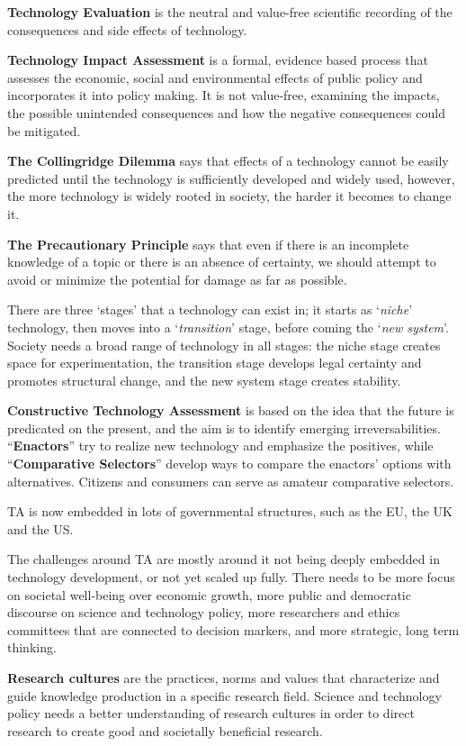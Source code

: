 \textbf{Technology Evaluation} is the neutral and value-free
scientific recording of the consequences and side effects of
technology.

\textbf{Technology Impact Assessment} is a formal, evidence based
process that assesses the economic, social and environmental effects
of public policy and incorporates it into policy making. It is not
value-free, examining the impacts, the possible unintended
consequences and how the negative consequences could be mitigated.

\textbf{The Collingridge Dilemma} says that effects of a technology
cannot be easily predicted until the technology is sufficiently
developed and widely used, however, the more technology is widely
rooted in society, the harder it becomes to change it.

\textbf{The Precautionary Principle} says that even if there is an
incomplete knowledge of a topic or there is an absence of certainty,
we should attempt to avoid or minimize the potential for damage as far
as possible.

There are three `stages' that a technology can exist in; it starts as
`\textit{niche}' technology, then moves into a `\textit{transition}'
stage, before coming the `\textit{new system}'. Society needs a broad
range of technology in all stages: the niche stage creates space for
experimentation, the transition stage develops legal certainty and
promotes structural change, and the new system stage creates
stability.

\textbf{Constructive Technology Assessment} is based on the idea that
the future is predicated on the present, and the aim is to identify
emerging irreversabilities. ``\textbf{Enactors}'' try to realize new
technology and emphasize the positives, while ``\textbf{Comparative
  Selectors}'' develop ways to compare the enactors' options with
alternatives. Citizens and consumers can serve as amateur comparative
selectors.

TA is now embedded in lots of governmental structures, such as the EU,
the UK and the US.

The challenges around TA are mostly around it not being deeply
embedded in technology development, or not yet scaled up fully. There
needs to be more focus on societal well-being over economic growth,
more public and democratic discourse on science and technology
policy, more researchers and ethics committees that are connected to
decision markers, and more strategic, long term thinking.

\textbf{Research cultures} are the practices, norms and values that
characterize and guide knowledge production in a specific research
field. Science and technology policy needs a better understanding of
research cultures in order to direct research to create good and
societally beneficial research.

